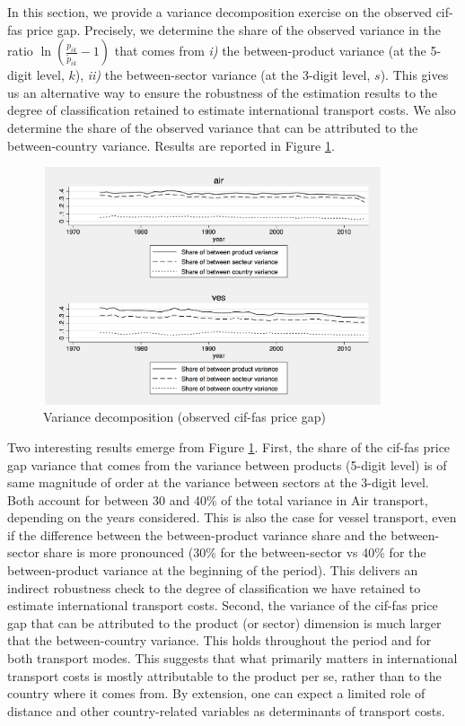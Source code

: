 \documentclass[a4paper,11pt]{article}
\begin{document}
In this section, we provide a variance decomposition exercise on the observed cif-fas price gap. Precisely, we determine the share of the observed variance in the ratio $\ln(\frac{p_{ik}}{\widetilde{p}_{ik}}-1)$ that comes from \textit{i)} the between-product variance (at the 5-digit level, $k$), \textit{ii)} the between-sector variance (at the 3-digit level, $s$). This gives us an alternative way to ensure the robustness of the estimation results to the degree of classification retained to estimate international transport costs. We also determine the share of the observed variance that can be attributed to the between-country variance. Results are reported in Figure \ref{fig:decomp_variance}.

\begin{figure}[htbp]
\caption{Variance decomposition (observed cif-fas price gap)}
\label{fig:decomp_variance}
\begin{center}
\includegraphics[width=10cm, height=7cm]{variance_decomposition.pdf}
\end{center}
\end{figure}

Two interesting results emerge from Figure \ref{fig:decomp_variance}. First, the share of the cif-fas price gap variance that comes from the variance between products (5-digit level) is of same magnitude of order at the variance between sectors at the 3-digit level. Both account for between 30 and 40\% of the total variance in Air transport, depending on the years considered. This is also the case for vessel transport, even if the difference between the between-product variance share and the between-sector share is more pronounced (30\% for the between-sector vs 40\% for the between-product variance at the beginning of the period). This delivers an indirect robustness check to the degree of classification we have retained to estimate international transport costs. Second, the variance of the cif-fas price gap that can be attributed to the product (or sector) dimension is much larger that the between-country variance. This holds throughout the period and for both transport modes. This suggests that what primarily matters in international transport costs is mostly attributable to the product per se, rather than to the country where it comes from. By extension, one can expect a limited role of distance and other country-related variables as determinants of transport costs.
\end{document}
